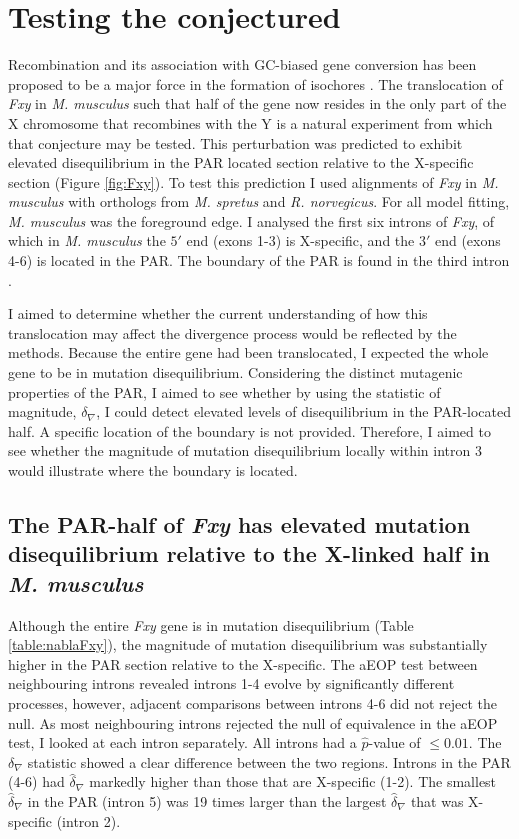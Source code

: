 

\section{Testing the conjectured}

Recombination and its association with GC-biased gene conversion has been proposed to be a major force in the formation of isochores \citep{Montoya-Burgos2003RecombinationGenomes}. The translocation of \textit{Fxy} in \textit{M. musculus} such that half of the gene now resides in the only part of the X chromosome that recombines with the Y is a natural experiment from which that conjecture may be tested. This perturbation was predicted to exhibit elevated disequilibrium in the PAR located section relative to the X-specific section (Figure \ref{fig:Fxy}). To test this prediction I used alignments of \textit{Fxy} in \textit{M. musculus} with orthologs from \textit{M. spretus} and \textit{R. norvegicus}. For all model fitting, \textit{M. musculus} was the foreground edge. I analysed the first six introns of \textit{Fxy}, of which in \textit{M. musculus} the $5'$ end (exons 1-3) is X-specific, and the $3'$ end (exons 4-6) is located in the PAR. The boundary of the PAR is found in the third intron \citep{Palmer1997AMice}. 

I aimed to determine whether the current understanding of how this translocation may affect the divergence process would be reflected by the methods. Because the entire gene had been translocated, I expected the whole gene to be in mutation disequilibrium. Considering the distinct mutagenic properties of the PAR, I aimed to see whether by using the statistic of magnitude, $\delta_\nabla$, I could detect elevated levels of disequilibrium in the PAR-located half. A specific location of the boundary is not provided. Therefore, I aimed to see whether the magnitude of mutation disequilibrium locally within intron 3 would illustrate where the boundary is located. 

\subsection{The PAR-half of \textit{Fxy} has elevated mutation disequilibrium relative to the X-linked half in \textit{M. musculus}}
\label{Fxy_TOE}

Although the entire \textit{Fxy} gene is in mutation disequilibrium (Table \ref{table:nablaFxy}), the magnitude of mutation disequilibrium was substantially higher in the PAR section relative to the X-specific. The aEOP test between neighbouring introns revealed introns 1-4 evolve by significantly different processes, however, adjacent comparisons between introns 4-6 did not reject the null. As most neighbouring introns rejected the null of equivalence in the aEOP test, I looked at each intron separately. All introns had a $\hat p$-value of $\leq 0.01$. The $\delta_\nabla$ statistic showed a clear difference between the two regions. Introns in the PAR (4-6) had $\hat\delta_\nabla$ markedly higher than those that are X-specific (1-2). The smallest $\hat \delta_\nabla$ in the PAR (intron 5) was 19 times larger than the largest $\hat \delta_\nabla$ that was X-specific (intron 2).

